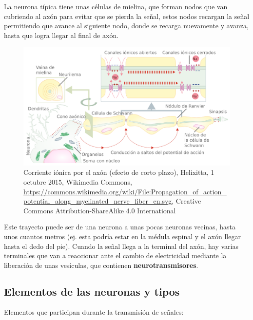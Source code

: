 La neurona típica tiene unas células de mielina, que forman nodos que van cubriendo al axón para evitar que se pierda la señal, estos nodos recargan la señal permitiendo que avance al siguiente nodo, donde se recarga nuevamente y avanza, hasta que logra llegar al final de axón.


\begin{figure}[h]
 \centering
 \includegraphics[scale=0.1]{../Figuras/Saltos.png}
 \caption{Corriente iónica por el axón (efecto de corto plazo), Helixitta, 1 octubre 2015, Wikimedia Commons, \url{https://commons.wikimedia.org/wiki/File:Propagation_of_action_potential_along_myelinated_nerve_fiber_en.svg}, Creative Commons Attribution-ShareAlike 4.0 International}
 \label{fig:conduccionSaltos}
\end{figure}


Este trayecto puede ser de una neurona a unas pocas neuronas vecinas, hasta unos cuantos metros (ej. esta podría estar en la médula espinal y el axón llegar hasta el dedo del pie). Cuando la señal llega a la terminal del axón, hay varias terminales que van a reaccionar ante el cambio de electricidad mediante la liberación de unas vesículas, que contienen \textbf{neurotransmisores}.




\subsection{Elementos de las neuronas y tipos}


Elementos que participan durante la transmisión de señales:


